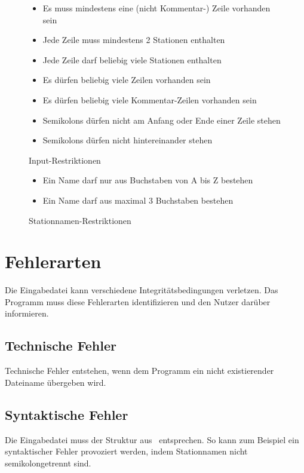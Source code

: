 \begin{figure}[h]
    \centering
    \caption{Input-Restriktionen}
    \begin{itemize}[noitemsep]
        \item Es muss mindestens eine (nicht Kommentar-) Zeile vorhanden sein
        \item Jede Zeile muss mindestens 2 Stationen enthalten
        \item Jede Zeile darf beliebig viele Stationen enthalten
        \item Es dürfen beliebig viele Zeilen vorhanden sein
        \item Es dürfen beliebig viele Kommentar-Zeilen vorhanden sein
        \item Semikolons dürfen nicht am Anfang oder Ende einer Zeile stehen
        \item Semikolons dürfen nicht hintereinander stehen
    \end{itemize}
    \label{auf:fig:input-restrictions}
\end{figure}

\begin{figure}[h]
    \centering
    \caption{Stationnamen-Restriktionen}
    \begin{itemize}[noitemsep]
        \item Ein Name darf nur aus Buchstaben von A bis Z bestehen
        \item Ein Name darf aus maximal 3 Buchstaben bestehen
    \end{itemize}
    \label{auf:fig:stationname-restrictions}
\end{figure}


\section{Fehlerarten}\label{auf:sec:fehlerarten}
Die Eingabedatei kann verschiedene Integritätsbedingungen verletzen.
Das Programm muss diese Fehlerarten identifizieren und den Nutzer darüber informieren.

\subsection{Technische Fehler}\label{auf:subsec:technische-fehler}
Technische Fehler entstehen, wenn dem Programm ein nicht existierender Dateiname übergeben wird.

\subsection{Syntaktische Fehler}\label{auf:subsec:syntaktische-fehler}
Die Eingabedatei muss der Struktur aus~ entsprechen.
So kann zum Beispiel ein syntaktischer Fehler provoziert werden, indem Stationnamen nicht semikolongetrennt sind.

